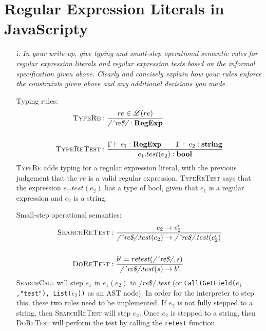 \documentclass[11pt, letter]{article}
\begin{document}
    \section{Regular Expression Literals in JavaScripty}
    \begin{itemize}
        \item [i.] \textit{In your write-up, give typing and small-step operational semantic rules
        for regular expression literals and regular expression tests based on the informal
        specification given above. Clearly and concisely explain how your rules enforce
        the constraints given above and any additional decisions you made.}

        Typing rules:
        \begin{align*}
            \textsc{TypeRe} &: \frac{re \in \mathscr{L}(re)}{\textit{/\^{}re\$/} : \textbf{RegExp}}\\\\
            \textsc{TypeReTest} &: \frac{\Gamma \vdash e_1 : \textbf{RegExp} \qquad \Gamma \vdash e_2 : \textbf{string}}{e_1.test(e_2) : \textbf{bool}}
        \end{align*}
        \textsc{TypeRe} adds typing for a regular expression literal, with the previous judgement that the
        $re$ is a valid regular expression. \textsc{TypeReTest} says that the expression $e_1.test(e_2)$ has 
        a type of bool, given that $e_1$ is a regular expression and $e_2$ is a string.

        Small-step operational semantics:
        \begin{align*}
            \textsc{SearchReTest} &: \frac{e_2 \to e_2'}{\textit{/\^{}re\$/}.test(e_2) \to \textit{/\^{}re\$/}.test(e_2')}\\\\
            \textsc{DoReTest} &: \frac{b' = retest(\textit{/\^{}re\$/}, s)}{\textit{/\^{}re\$/}.test(s) \to b'}
        \end{align*}
        \textsc{SearchCall} will step $e_1$ in $e_1(e_2)$ to $\textit{/\^{}re\$/}.test$ (or \texttt{Call(GetField($e_1$,"test"), List($e_2$))}
        as an AST node). In order for the interpreter to step this, these two rules need to be implemented.
        If $e_2$ is not fully stepped to a string, then \textsc{SearchReTest} will step $e_2$. Once $e_2$
        is stepped to a string, then \textsc{DoReTest} will perform the test by calling the \texttt{retest} 
        function.
    \end{itemize}
\end{document}
